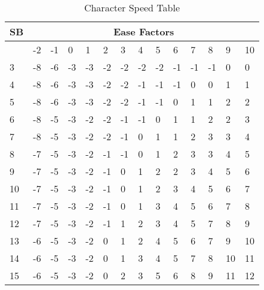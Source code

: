 \begin{table}[h]
\centering
\caption{Character Speed Table\label{tab:CharSpeed}}
\small
	\begin{tabular}{llllllllllllll} \hline
	SB & \multicolumn{13}{c}{Ease Factors} \\ \hline \hline
	   & -2  & -1  &  0  &  1  &  2  &  3  &  4  &  5  &  6  &  7  &  8  &  9  & 10 \\ \cline{2-14}
	 3  & -8  & -6  & -3  & -3  & -2  & -2  & -2  & -2  & -1  & -1  & -1  &  0  &  0 \\
	 4  & -8  & -6  & -3  & -3  & -2  & -2  & -1  & -1  & -1  &  0  &  0  &  1  &  1 \\
	 5  & -8  & -6  & -3  & -3  & -2  & -2  & -1  & -1  &  0  &  1  &  1  &  2  &  2 \\
	 6  & -8  & -5  & -3  & -2  & -2  & -1  & -1  &  0  &  1  &  1  &  2  &  2  &  3 \\
	 7  & -8  & -5  & -3  & -2  & -2  & -1  &  0  &  1  &  1  &  2  &  3  &  3  &  4 \\
	 8  & -7  & -5  & -3  & -2  & -1  & -1  &  0  &  1  &  2  &  3  &  3  &  4  &  5 \\
	 9  & -7  & -5  & -3  & -2  & -1  &  0  &  1  &  2  &  2  &  3  &  4  &  5  &  6 \\
	10  & -7  & -5  & -3  & -2  & -1  &  0  &  1  &  2  &  3  &  4  &  5  &  6  &  7 \\
	11  & -7  & -5  & -3  & -2  & -1  &  0  &  1  &  3  &  4  &  5  &  6  &  7  &  8 \\
	12  & -7  & -5  & -3  & -2  & -1  &  1  &  2  &  3  &  4  &  5  &  7  &  8  &  9 \\
	13  & -6  & -5  & -3  & -2  &  0  &  1  &  2  &  4  &  5  &  6  &  7  &  9  & 10 \\
	14  & -6  & -5  & -3  & -2  &  0  &  1  &  3  &  4  &  5  &  7  &  8  & 10  & 11 \\
	15  & -6  & -5  & -3  & -2  &  0  &  2  &  3  &  5  &  6  &  8  &  9  & 11  & 12 \\ \hline
	\end{tabular}                                                                                                                     
\normalsize
\end{table}                                                                                                                         
